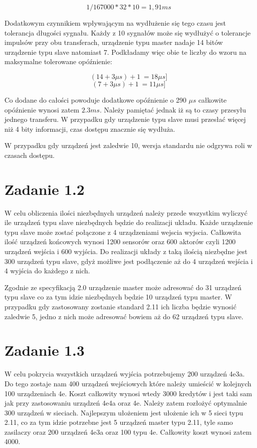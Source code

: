 \documentclass[paper=a4, fontsize=11pt]{scrartcl} %
\numberwithin{equation}{section} %
\numberwithin{figure}{section} %
\numberwithin{table}{section} %
\begin{document}
\[1/ 167000 * 32 * 10 = 1,91 ms \]


Dodatkowym czynnikiem wpływającym na wydłużenie się tego czasu jest tolerancja długości sygnału. Każdy z 10 sygnałów może się wydłużyć o
tolerancje impulsów przy obu transferach, urządzenie typu master nadaje 14 bitów urządzenie typu slave natomiast 7.
Podkładamy więc obie te liczby do wzoru na maksymalne tolerowane opóźnienie:

\[(14+3\mu s) + 1\ = 18 \mu s]\]
\[(7+3\mu s) + 1\ = 11 \mu s]\]

Co dodane do całości powoduje dodatkowe opóźnienie o 290 \(\mu s\) całkowite opóźnienie wynosi zatem \(2.3 ms\).
Należy pamiętać jednak iż są to czasy przesyłu jednego transferu. W przypadku gdy urządzenie typu slave musi przesłać więcej niż 4 bity
informacji, czas dostępu znacznie się wydłuża.

W przypadku gdy urządzeń jest zaledwie 10, wersja standardu nie odgrywa roli w czasach dostępu.

\section{Zadanie 1.2}

W celu obliczenia ilości niezbędnych urządzeń należy przede wszystkim wyliczyć ile urządzeń typu slave
niezbędnych będzie do realizacji układu. Każde urządzenie typu slave może zostać połączone z 4 urządzeniami wejscia wyjscia.
Całkowita ilość urządzeń końcowych wynosi 1200 sensorów oraz 600 aktorów czyli 1200 urządzeń wejścia i 600 wyjścia. Do realizacji układy z taką ilością
niezbędne jest 300 urządzeń typu slave, gdyż możliwe jest podłączenie aż do 4 urządzeń wejścia i 4 wyjścia do każdego z nich. 

Zgodnie ze specyfikacją 2.0 urządzenie master może adresować do 31 urządzeń typu slave co za tym idzie niezbędnych będzie 10 urządzeń
typu master.
W przypadku gdy zastosowany zostanie standard 2.11 ich liczba będzie wynosić zaledwie 5, jedno z nich może adresować bowiem aż do 62 urządzeń
typu slave.


\section{Zadanie 1.3}


W celu pokrycia wszystkich urządzeń wyjścia potrzebujemy 200 urządzeń 4e3a. Do tego zostaje nam 400 urządzeń wejściowych które
należy umieścić w kolejnych 100 urządzeniach 4e. Koszt całkowity wynosi wtedy 3000 kredytów i jest taki sam jak przy zastosowaniu
urządzeń 4e4a oraz 4e. Należy zatem rozłożyć optymalnie 300 urządzeń w sieciach. Najlepszym ułożeniem jest ułożenie ich w 5 sieci
typu 2.11, co za tym idzie potrzebne jest 5 urządzeń master typu 2.11, tyle samo zasilaczy oraz 200 urządzeń 4e3a oraz 100 typu 4e.
Całkowity koszt wynosi zatem 4000.
\end{document}
